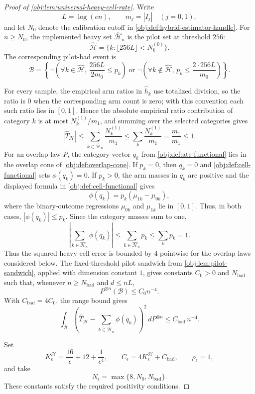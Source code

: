 \begin{proof}[Proof of \cref{obj:lem:universal-heavy-cell-rate}]
Write
\[
L=\log(en),\qquad m_j=|I_j|\quad (j=0,1),
\]
and let \(N_0\) denote the calibration cutoff in \cref{obj:def:hybrid-estimator-handle}. For
\(n\ge N_0\), the implemented heavy set \(\widehat{\mathcal H}_n\) is the pilot set at
threshold \(256\):
\[
\widehat{\mathcal H}
=
\{k:\lfloor 256L\rfloor<N_k^{(0)}\}.
\]
The corresponding pilot-bad event is
\[
\mathcal B
=
\left\{
\neg\left(\forall k\in\widehat{\mathcal H},\,\frac{256L}{2m_0}\le p_k\right)
\mathrel{\text{or}}
\neg\left(\forall k\notin\widehat{\mathcal H},\,p_k\le \frac{2\cdot256L}{m_0}\right)
\right\}.
\]

For every sample, the empirical arm ratios in \(\widehat h_k\) use totalized division, so the
ratio is \(0\) when the corresponding arm count is zero; with this convention each such ratio
lies in \([0,1]\). Hence the absolute empirical ratio contribution of category \(k\) is at most
\(N_k^{(1)}/m_1\), and summing over the selected categories gives
\[
|\widehat T_{\mathcal H}|
\le
\sum_{k\in\widehat{\mathcal H}_n}\frac{N_k^{(1)}}{m_1}
\le
\sum_k\frac{N_k^{(1)}}{m_1}
=
\frac{m_1}{m_1}
\le1.
\]
For an overlap law \(P\), the category vector \(q_k\) from \cref{obj:def:ate-functional}
lies in the overlap cone of \cref{obj:def:overlap-cone}. If \(p_k=0\), then \(q_k=0\) and
\cref{obj:def:cell-functional} sets \(\phi(q_k)=0\). If \(p_k>0\), the arm masses in
\(q_k\) are positive and the displayed formula in \cref{obj:def:cell-functional} gives
\[
\phi(q_k)=p_k(\mu_{1k}-\mu_{0k}),
\]
where the binary-outcome regressions \(\mu_{0k}\) and \(\mu_{1k}\) lie in \([0,1]\). Thus, in
both cases, \(|\phi(q_k)|\le p_k\). Since the category masses sum to one,
\[
\left|\sum_{k\in\widehat{\mathcal H}_n}\phi(q_k)\right|
\le
\sum_{k\in\widehat{\mathcal H}_n}p_k
\le
\sum_k p_k
=1.
\]
Thus the squared heavy-cell error is bounded by \(4\) pointwise for the overlap laws considered
below. The fixed-threshold pilot sandwich from \cref{obj:lem:pilot-sandwich}, applied with
dimension constant \(1\), gives constants \(C_0>0\) and \(N_{\mathrm{bad}}\) such that, whenever
\(n\ge N_{\mathrm{bad}}\) and \(d\le nL\),
\[
P^{\otimes n}(\mathcal B)\le C_0 n^{-4}.
\]
With \(C_{\mathrm{bad}}=4C_0\), the range bound gives
\[
\int_{\mathcal B}
\left(
\widehat T_{\mathcal H}
-
\sum_{k\in\widehat{\mathcal H}_n}\phi(q_k)
\right)^2
\,dP^{\otimes n}
\le C_{\mathrm{bad}}\,n^{-4}.
\] %

Set
\[
K^{\mathcal H}_\epsilon=\frac{16}{\epsilon}+12+\frac1{\epsilon^4},
\qquad
C_\epsilon=4K^{\mathcal H}_\epsilon+C_{\mathrm{bad}},
\qquad
\rho_\epsilon=1,
\]
and take
\[
N_\epsilon=\max\{8,N_0,N_{\mathrm{bad}}\}.
\] %
These constants satisfy the required positivity conditions.


\end{proof}
